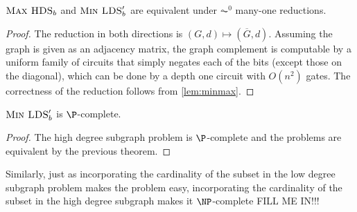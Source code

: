 \documentclass{article}
\begin{document}
\begin{theorem}
  $\textsc{Max HDS}_b$ and $\textsc{Min LDS}_b'$ are equivalent under $\AC^0$ many-one reductions.
\end{theorem}
\begin{proof}
  The reduction in both directions is $(G, d) \mapsto (\overline{G}, d)$.
  Assuming the graph is given as an adjacency matrix, the graph complement is computable by a uniform family of circuits that simply negates each of the bits (except those on the diagonal), which can be done by a depth one circuit with $O(n^2)$ gates.
  The correctness of the reduction follows from \autoref{lem:minmax}.
\end{proof}

\begin{corollary}
  $\textsc{Min LDS}'_b$ is $\P$-complete.
\end{corollary}
\begin{proof}
  The high degree subgraph problem is $\P$-complete \autocite{am84} and the problems are equivalent by the previous theorem.
\end{proof}

Similarly, just as incorporating the cardinality of the subset in the low degree subgraph problem makes the problem easy, incorporating the cardinality of the subset in the high degree subgraph makes it $\NP$-complete FILL ME IN!!!

\printbibliography
\end{document}
